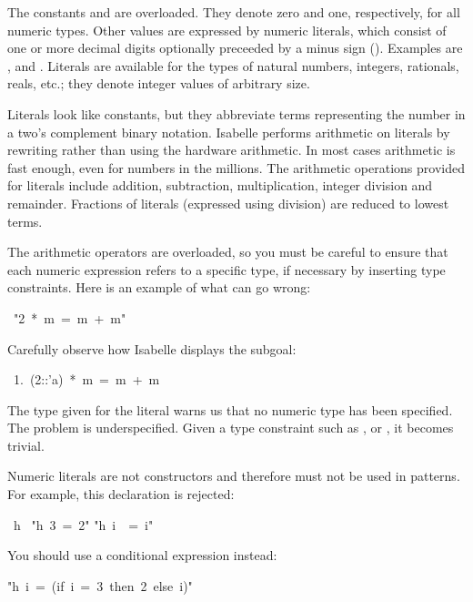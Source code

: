 %
The constants  and  are overloaded.  They denote zero and one,
respectively, for all numeric types.  Other values are expressed by numeric
literals, which consist of one or more decimal digits optionally preceeded by a minus sign (\isa{-}).  Examples are ,  and
.  Literals are available for the types of natural
numbers, integers, rationals, reals, etc.; they denote integer values of
arbitrary size.

Literals look like constants, but they abbreviate
terms representing the number in a two's complement binary notation.
Isabelle performs arithmetic on literals by rewriting rather
than using the hardware arithmetic. In most cases arithmetic
is fast enough, even for numbers in the millions. The arithmetic operations
provided for literals include addition, subtraction, multiplication,
integer division and remainder.  Fractions of literals (expressed using
division) are reduced to lowest terms.

\begin{warn}
The arithmetic operators are
overloaded, so you must be careful to ensure that each numeric
expression refers to a specific type, if necessary by inserting
type constraints.  Here is an example of what can go wrong:
\par
\begin{isabelle}
\ "2\ *\ m\ =\ m\ +\ m"
\end{isabelle}
%
Carefully observe how Isabelle displays the subgoal:
\begin{isabelle}
\ 1.\ (2::'a)\ *\ m\ =\ m\ +\ m
\end{isabelle}
The type  given for the literal  warns us that no numeric
type has been specified.  The problem is underspecified.  Given a type
constraint such as ,  or , it becomes trivial.
\end{warn}

\begin{warn}
Numeric literals are not constructors and therefore
must not be used in patterns.  For example, this declaration is
rejected:
\begin{isabelle}
\ h\ \isanewline
"h\ 3\ =\ 2"\isanewline
\isacharbar "h\ i\ \ =\ i"
\end{isabelle}

You should use a conditional expression instead:
\begin{isabelle}
"h\ i\ =\ (if\ i\ =\ 3\ then\ 2\ else\ i)"
\end{isabelle}
\end{warn}


